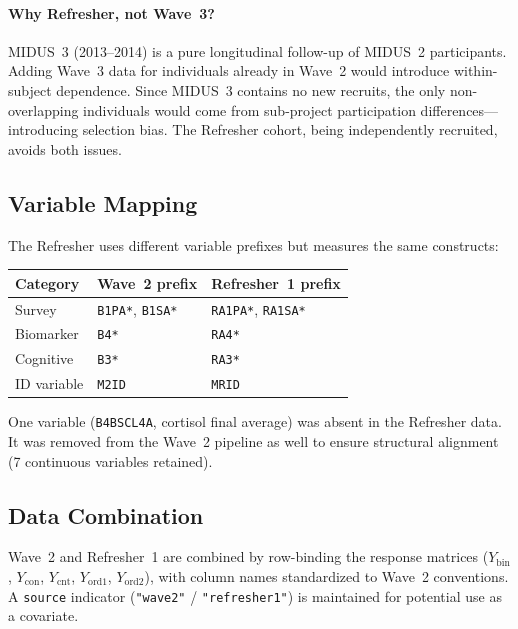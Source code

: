 \documentclass[11pt]{article}
\begin{document}
\paragraph{Why Refresher, not Wave~3?}
MIDUS~3 (2013--2014) is a pure longitudinal follow-up of MIDUS~2 participants.
Adding Wave~3 data for individuals already in Wave~2 would introduce within-subject dependence.
Since MIDUS~3 contains no new recruits, the only non-overlapping individuals would come from sub-project participation differences---introducing selection bias.
The Refresher cohort, being independently recruited, avoids both issues.

\subsection{Variable Mapping}

The Refresher uses different variable prefixes but measures the same constructs:

\begin{center}
\begin{tabular}{lll}
\toprule
Category & Wave~2 prefix & Refresher~1 prefix \\
\midrule
Survey & \texttt{B1PA*}, \texttt{B1SA*} & \texttt{RA1PA*}, \texttt{RA1SA*} \\
Biomarker & \texttt{B4*} & \texttt{RA4*} \\
Cognitive & \texttt{B3*} & \texttt{RA3*} \\
ID variable & \texttt{M2ID} & \texttt{MRID} \\
\bottomrule
\end{tabular}
\end{center}

One variable (\texttt{B4BSCL4A}, cortisol final average) was absent in the Refresher data.
It was removed from the Wave~2 pipeline as well to ensure structural alignment (7 continuous variables retained).

\subsection{Data Combination}

Wave~2 and Refresher~1 are combined by row-binding the response matrices ($Y_\text{bin}$, $Y_\text{con}$, $Y_\text{cnt}$, $Y_\text{ord1}$, $Y_\text{ord2}$), with column names standardized to Wave~2 conventions.
A \texttt{source} indicator (\texttt{"wave2"} / \texttt{"refresher1"}) is maintained for potential use as a covariate.
\end{document}
